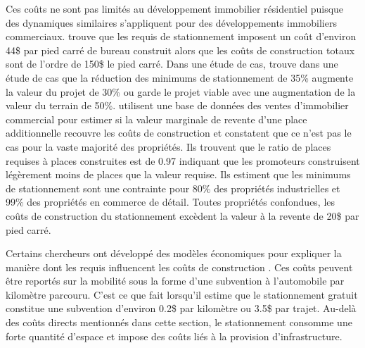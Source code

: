             Ces coûts ne sont pas limités au développement immobilier résidentiel puisque des dynamiques similaires s'appliquent pour des développements immobiliers commerciaux. \textcite{franco_shadow_2020} trouve que les requis de stationnement imposent un coût d'environ 44\$ par pied carré de bureau construit alors que les coûts de construction totaux sont de l'ordre de 150\$ le pied carré. Dans une étude de cas, \textcite{willson_suburban_1995} trouve dans une étude de cas que la réduction des minimums de stationnement de 35\% augmente la valeur du projet de 30\% ou garde le projet viable avec une augmentation de la valeur du terrain de 50\%. \textcite{cutter_parking_2012} utilisent une base de données des ventes d'immobilier commercial pour estimer si la valeur marginale de revente d'une place additionnelle recouvre les coûts de construction et constatent que ce n'est pas le cas pour la vaste majorité des propriétés. Ils trouvent que le ratio de places requises à places construites est de 0.97 indiquant que les promoteurs construisent légèrement moins de places que la valeur requise. Ils estiment que les minimums de stationnement sont une contrainte pour 80\% des propriétés industrielles et 99\% des propriétés en commerce de détail. Toutes propriétés confondues, les coûts de construction du stationnement excèdent la valeur à la revente de 20\$ par pied carré. \par

            Certains chercheurs ont développé des modèles économiques pour expliquer la manière dont les requis influencent les coûts de construction \parencite{lehe_how_2018,andersson_effect_2016}. Ces coûts peuvent être reportés sur la mobilité sous la forme d'une subvention à l'automobile par kilomètre parcouru. C'est ce que fait \citeauthor{litman_comprehensive_2023} lorsqu'il estime que le stationnement gratuit constitue une subvention d'environ 0.2\$ par kilomètre ou 3.5\$ par trajet. Au-delà des coûts directs mentionnés dans cette section, le stationnement consomme une forte quantité d'espace et impose des coûts liés à la provision d'infrastructure.
